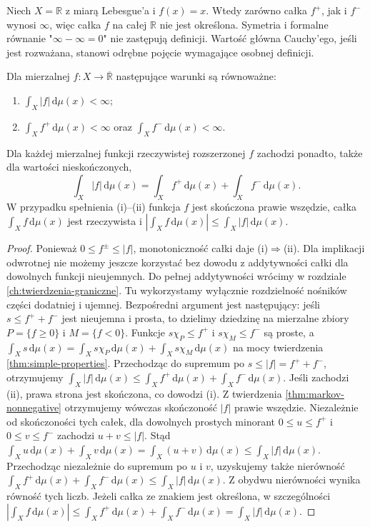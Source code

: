 \begin{uwaga}
Niech $X=\mathbb R$ z miarą Lebesgue'a i
$f(x)=x$. Wtedy zarówno całka $f^+$, jak i $f^-$
wynosi $\infty$, więc całka $f$ na całej $\mathbb R$
nie jest określona. Symetria i formalne równanie
"$\infty-\infty=0$" nie zastępują definicji.
Wartość główna Cauchy'ego, jeśli jest rozważana,
stanowi odrębne pojęcie wymagające osobnej definicji.
\end{uwaga}

\begin{twierdzenie}
\label{thm:integrability-criterion}
Dla mierzalnej $f:X\to\overline{\mathbb R}$ następujące
warunki są równoważne:
\begin{enumerate}[label=\textup{(\roman*)}]
\item $\int_X|f|\,\mathrm d\mu(x)<\infty$;
\item $\int_Xf^+\,\mathrm d\mu(x)<\infty$ oraz
$\int_Xf^-\,\mathrm d\mu(x)<\infty$.
\end{enumerate}
Dla każdej mierzalnej funkcji rzeczywistej rozszerzonej
$f$ zachodzi ponadto, także dla wartości nieskończonych,
\[
 \int_X |f|\,\mathrm d\mu(x)
 =\int_X f^+\,\mathrm d\mu(x)+\int_X f^-\,\mathrm d\mu(x).
\]
W przypadku spełnienia (i)--(ii) funkcja $f$ jest
skończona prawie wszędzie,
całka $\int_Xf\,\mathrm d\mu(x)$ jest rzeczywista i
$|\int_Xf\,\mathrm d\mu(x)|\le\int_X|f|\,\mathrm d\mu(x)$.
\end{twierdzenie}
\begin{proof}
Ponieważ $0\le f^\pm\le|f|$, monotoniczność całki
daje (i)$\Rightarrow$(ii). Dla implikacji odwrotnej
nie możemy jeszcze korzystać bez dowodu z addytywności
całki dla dowolnych funkcji nieujemnych. Do pełnej addytywności wrócimy w rozdziale
\ref{ch:twierdzenia-graniczne}. Tu wykorzystamy
wyłącznie rozdzielność nośników części dodatniej i ujemnej.
Bezpośredni argument jest następujący: jeśli
$s\le f^++f^-$ jest nieujemna i prosta, to
dzielimy dziedzinę na mierzalne zbiory
$P=\{f\ge0\}$ i $M=\{f<0\}$. Funkcje
$s\chi_P\le f^+$ i $s\chi_M\le f^-$
są proste, a
$\int_Xs\,\mathrm d\mu(x)=
\int_Xs\chi_P\,\mathrm d\mu(x)+
\int_Xs\chi_M\,\mathrm d\mu(x)$
na mocy twierdzenia \ref{thm:simple-properties}.
Przechodząc do supremum po $s\le|f|=f^++f^-$,
otrzymujemy
$\int_X|f|\,\mathrm d\mu(x)\le
\int_Xf^+\,\mathrm d\mu(x)+
\int_Xf^-\,\mathrm d\mu(x)$.
Jeśli zachodzi (ii), prawa strona jest skończona,
co dowodzi (i). Z twierdzenia \ref{thm:markov-nonnegative}
otrzymujemy wówczas skończoność $|f|$ prawie wszędzie.
Niezależnie od skończoności tych całek, dla dowolnych prostych minorant
$0\le u\le f^+$ i $0\le v\le f^-$ zachodzi
$u+v\le|f|$. Stąd
$\int_Xu\,\mathrm d\mu(x)+\int_Xv\,\mathrm d\mu(x)
=\int_X(u+v)\,\mathrm d\mu(x)
\le\int_X|f|\,\mathrm d\mu(x)$.
Przechodząc niezależnie do supremum po $u$ i $v$,
uzyskujemy także nierówność
$\int_Xf^+\,\mathrm d\mu(x)+\int_Xf^-\,\mathrm d\mu(x)
\le\int_X|f|\,\mathrm d\mu(x)$.
Z obydwu nierówności wynika równość tych liczb.
Jeżeli całka ze znakiem jest określona, w szczególności
$|\int_Xf\,\mathrm d\mu(x)|
\le\int_Xf^+\,\mathrm d\mu(x)+
\int_Xf^-\,\mathrm d\mu(x)=\int_X|f|\,\mathrm d\mu(x)$.
\end{proof}


